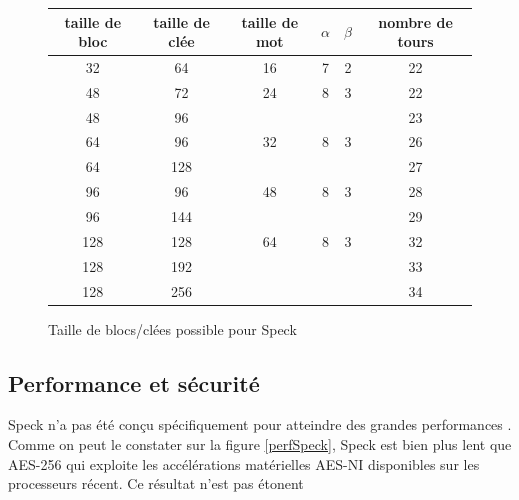 			\begin{figure}[H]
				\centering
				\bgroup
				\def\arraystretch{1.2}
				\begin{tabular}{ccc|cc|c}
					taille de bloc & taille de clée & taille de mot & $\alpha$ & $\beta$ & nombre de tours \\
					\hline
					32 & 64  & 16 & 7 & 2 & 22 \\
					\hline
					48 & 72  & 24 & 8 & 3 & 22 \\
					48 & 96  &  & & & 23 \\
					\hline
					64 & 96  & 32 & 8 & 3 & 26 \\
					64 & 128 & &  & & 27 \\
					\hline
					96 & 96  & 48 & 8 & 3 & 28 \\
					96 & 144 & & & & 29 \\
					\hline
					128 & 128 & 64 & 8 & 3 & 32 \\
					128 & 192 & & & & 33 \\
					128 & 256 & & & & 34 \\
				\end{tabular}
				\egroup
				\caption{Taille de blocs/clées possible pour Speck}
			 	\label{tailleSpeck}
			\end{figure}

			\vspace{0.5cm}

		\subsection{Performance et sécurité}

			Speck n'a pas été conçu spécifiquement pour atteindre des grandes
			performances \cite{speck_families}. Comme on peut le constater sur la figure
			\ref{perfSpeck}, Speck est bien plus lent que AES-256 qui exploite les
			accélérations matérielles AES-NI disponibles sur les processeurs récent.
			Ce résultat n'est pas étonent

